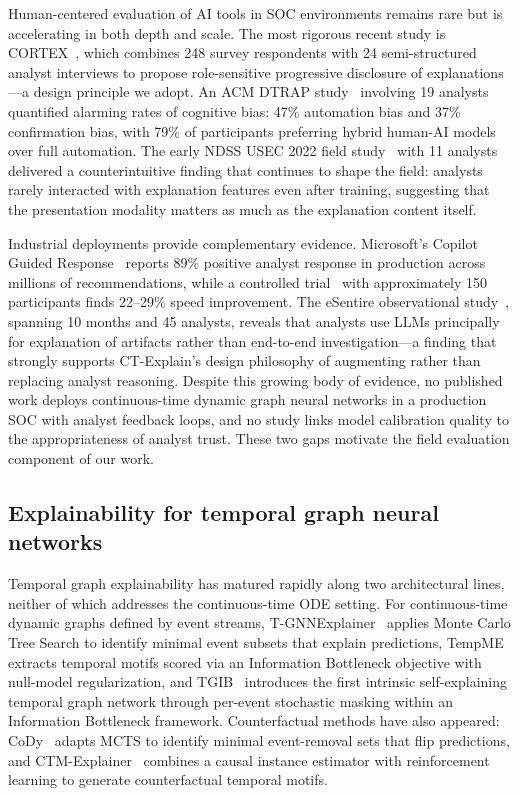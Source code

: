 \documentclass[preprint,review,12pt]{elsarticle}
\begin{document}
Human-centered evaluation of AI tools in SOC environments remains rare but is accelerating in both depth and scale. The most rigorous recent study is CORTEX~\cite{cortex2025}, which combines 248 survey respondents with 24 semi-structured analyst interviews to propose role-sensitive progressive disclosure of explanations---a design principle we adopt. An ACM DTRAP study~\cite{acm_dtrap_2025} involving 19 analysts quantified alarming rates of cognitive bias: 47\% automation bias and 37\% confirmation bias, with 79\% of participants preferring hybrid human-AI models over full automation. The early NDSS USEC 2022 field study~\cite{ndss_usec_2022} with 11 analysts delivered a counterintuitive finding that continues to shape the field: analysts rarely interacted with explanation features even after training, suggesting that the presentation modality matters as much as the explanation content itself.

Industrial deployments provide complementary evidence. Microsoft's Copilot Guided Response~\cite{microsoft_cgr_2024} reports 89\% positive analyst response in production across millions of recommendations, while a controlled trial~\cite{microsoft_rct_2024} with approximately 150 participants finds 22--29\% speed improvement. The eSentire observational study~\cite{esentire_2025}, spanning 10 months and 45 analysts, reveals that analysts use LLMs principally for explanation of artifacts rather than end-to-end investigation---a finding that strongly supports CT-Explain's design philosophy of augmenting rather than replacing analyst reasoning. Despite this growing body of evidence, no published work deploys continuous-time dynamic graph neural networks in a production SOC with analyst feedback loops, and no study links model calibration quality to the appropriateness of analyst trust. These two gaps motivate the field evaluation component of our work.

\subsection{Explainability for temporal graph neural networks}

Temporal graph explainability has matured rapidly along two architectural lines, neither of which addresses the continuous-time ODE setting. For continuous-time dynamic graphs defined by event streams, T-GNNExplainer~\cite{t_gnnexplainer_2023} applies Monte Carlo Tree Search to identify minimal event subsets that explain predictions, TempME~\cite{tempme_2024} extracts temporal motifs scored via an Information Bottleneck objective with null-model regularization, and TGIB~\cite{tgib_kdd_2024} introduces the first intrinsic self-explaining temporal graph network through per-event stochastic masking within an Information Bottleneck framework. Counterfactual methods have also appeared: CoDy~\cite{cody_2025} adapts MCTS to identify minimal event-removal sets that flip predictions, and CTM-Explainer~\cite{ctm_explainer_2025} combines a causal instance estimator with reinforcement learning to generate counterfactual temporal motifs.
\end{document}
